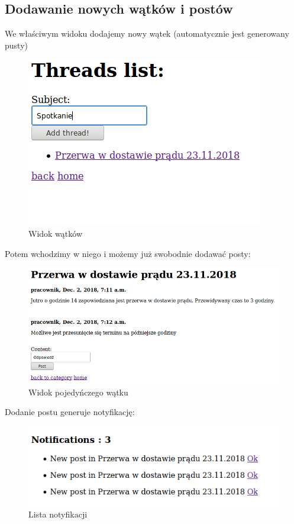 \documentclass[12pt]{article}
\begin{document}
\subsection{Dodawanie nowych wątków i postów}
We właściwym widoku dodajemy nowy wątek (automatycznie jest generowany pusty)
\begin{figure}[H]
	\centering
	\includegraphics[scale=0.7]{img/11.png}
	\caption{Widok wątków}
\end{figure}
Potem wchodzimy w niego i możemy już swobodnie dodawać posty:
\begin{figure}[H]
	\centering
	\includegraphics[scale=0.5]{img/13.png}
	\caption{Widok pojedyńczego wątku}
\end{figure}
Dodanie postu generuje notyfikację:
\begin{figure}[H]
	\centering
	\includegraphics[scale=0.7]{img/14.png}
	\caption{Lista notyfikacji}
\end{figure}
\end{document}
